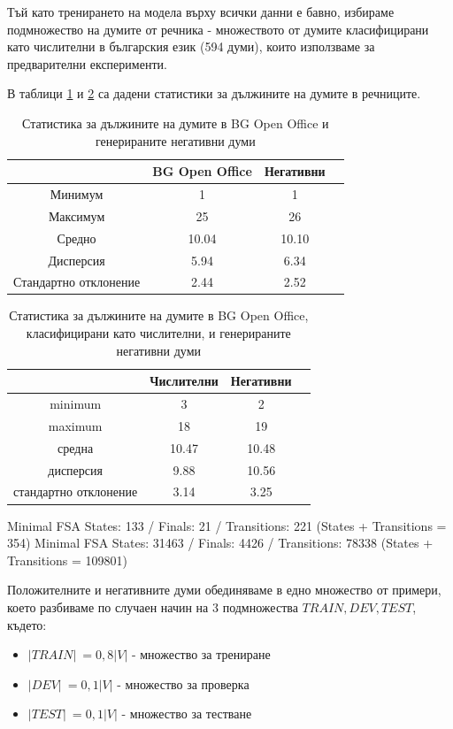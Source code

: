 \documentclass[a4paper,12pt]{article}
\begin{document}
Тъй като тренирането на модела върху всички данни е бавно, избираме подмножество на думите от речника - множеството от думите класифицирани като числителни в българския език (594 думи), които използваме за предварителни експерименти. 

В таблици \ref{table:1} и \ref{table:2} са дадени статистики за дължините на думите в речниците.

\begin{table}[h!]
\centering
\begin{tabular}{|c|c|c|c|}
\hline
& BG Open Office & Негативни \\
\hline
Минимум & 1 & 1\\
\hline
Максимум & 25 & 26\\
\hline
Средно & 10.04 & 10.10\\
\hline
Дисперсия & 5.94 & 6.34\\
\hline
Стандартно отклонение & 2.44 & 2.52\\
\hline
\end{tabular}
\caption{Статистика за дължините на думите в BG Open Office и генерираните негативни думи}
\label{table:1}
\end{table}

\begin{table}[h!]
\centering
\begin{tabular}{|c|c|c|c|}
\hline
& Числителни & Негативни \\
\hline
minimum & 3 & 2\\
\hline
maximum & 18 & 19\\
\hline
средна & 10.47 & 10.48\\
\hline
дисперсия & 9.88 & 10.56\\
\hline
стандартно отклонение & 3.14 & 3.25\\
\hline
\end{tabular}
\caption{Статистика за дължините на думите в BG Open Office, класифицирани като числителни, и генерираните негативни думи}
\label{table:2}
\end{table}

Minimal FSA States: 133 / Finals: 21 / Transitions: 221 (States + Transitions = 354)
Minimal FSA States:  31463 / Finals: 4426 / Transitions: 78338  (States + Transitions = 109801)

Положителните и негативните думи обединяваме в едно множество от примери, което разбиваме по случаен начин на 3 подмножества $TRAIN, DEV, TEST$, където:
\begin{itemize}
 \item $|TRAIN|\:= 0,8|V|$ - множество за трениране
 \item $|DEV|\:= 0,1|V|$ - множество за проверка
 \item $|TEST|\:= 0,1|V|$ - множество за тестване
\end{itemize}
\end{document}
